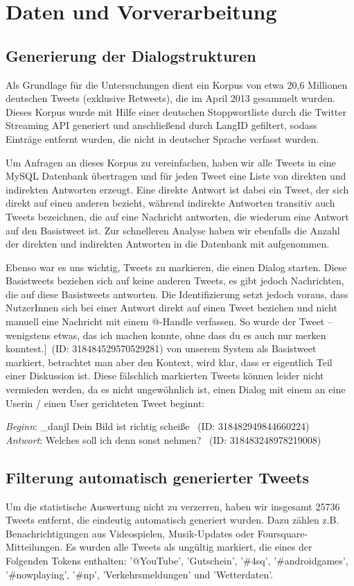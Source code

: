 \documentclass[twitterDialoge.tex]{subfiles}
\begin{document}
\section{Daten und Vorverarbeitung}
\subsection{Generierung der Dialogstrukturen}
Als Grundlage für die Untersuchungen dient ein Korpus von etwa 20,6 Millionen deutschen Tweets (exklusive Retweets), die im April 2013 gesammelt wurden. Dieses Korpus wurde mit Hilfe einer deutschen Stoppwortliste durch die Twitter Streaming API generiert und anschließend durch LangID gefiltert, sodass Einträge entfernt wurden, die nicht in deutscher Sprache verfasst wurden.


Um Anfragen an dieses Korpus zu vereinfachen, haben wir alle Tweets in eine MySQL Datenbank übertragen und für jeden Tweet eine Liste von direkten und indirekten Antworten erzeugt. Eine direkte Antwort ist dabei ein Tweet, der sich direkt auf einen anderen bezieht, während indirekte Antworten transitiv auch Tweets bezeichnen, die auf eine Nachricht antworten, die wiederum eine Antwort auf den Basistweet ist. Zur schnelleren Analyse haben wir ebenfalls die Anzahl der direkten und indirekten Antworten in die Datenbank mit aufgenommen.


Ebenso war es uns wichtig, Tweets zu markieren, die einen Dialog starten. Diese Basistweets beziehen sich auf keine anderen Tweets, es gibt jedoch Nachrichten, die auf diese Basistweets antworten. Die Identifizierung setzt jedoch voraus, dass NutzerInnen sich bei einer Antwort direkt auf einen Tweet beziehen und nicht manuell eine Nachricht mit einem @-Handle verfassen. So wurde der Tweet \glqq@DeigningDiamond -- wenigstens etwas, das ich machen konnte, ohne dass du es auch nur merken konntest.]\grqq ~(ID: 318484529570529281) von unserem System als Basistweet markiert, betrachtet man aber den Kontext, wird klar, dass er eigentlich Teil einer Diskussion ist. 
Diese fälschlich markierten Tweets können leider nicht vermieden werden, da es nicht ungewöhnlich ist, einen Dialog mit einem an eine Userin / einen User gerichteten Tweet beginnt: 


\textit{Beginn}:     \glqq@\_danjl Dein Bild ist richtig scheiße\grqq ~ (ID: 318482949844660224) \\
\textit{Antwort}:    \glqq@chrisgoescross Welches soll ich denn sonst nehmen?\grqq ~ (ID: 318483248978219008)

\subsection{Filterung automatisch generierter Tweets}
Um die statistische Auswertung nicht zu verzerren, haben wir insgesamt 25736 Tweets entfernt, die eindeutig automatisch generiert wurden. Dazu zählen z.B. Benachrichtigungen aus Videospielen, Musik-Updates oder Foursquare-Mitteilungen. Es wurden alle Tweets als ungültig markiert, die eines der Folgenden Tokens enthalten: '@YouTube', 'Gutschein', '\#4sq', '\#androidgames', '\#nowplaying', '\#np', 'Verkehrsmeldungen' und 'Wetterdaten'.
\end{document}
